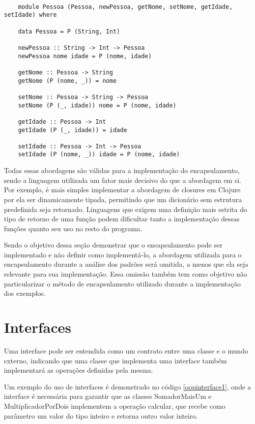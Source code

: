 \begin{lstlisting}[caption={Módulos como forma de encapsulamento},label=modulesencap]
    
    module Pessoa (Pessoa, newPessoa, getNome, setNome, getIdade, setIdade) where

    data Pessoa = P (String, Int)

    newPessoa :: String -> Int -> Pessoa
    newPessoa nome idade = P (nome, idade)

    getNome :: Pessoa -> String
    getNome (P (nome, _)) = nome

    setNome :: Pessoa -> String -> Pessoa
    setNome (P (_, idade)) nome = P (nome, idade)

    getIdade :: Pessoa -> Int
    getIdade (P (_, idade)) = idade

    setIdade :: Pessoa -> Int -> Pessoa
    setIdade (P (nome, _)) idade = P (nome, idade)

\end{lstlisting}

Todas essas abordagens são válidas para a 
implementação do encapsulamento, sendo a 
linguagem utilizada um fator mais decisivo 
do que a abordagem em si. Por exemplo, é 
mais simples implementar a abordagem de closures 
em Clojure por ela ser dinamicamente tipada, 
permitindo que um dicionário sem estrutura 
predefinida seja retornado. Linguagens que exigem 
uma definição mais estrita do tipo de retorno 
de uma função podem dificultar tanto a 
implementação dessas funções quanto seu uso 
no resto do programa.

Sendo o objetivo dessa seção demonstrar que 
o encapsulamento pode ser implementado e 
não definir como implementá-lo, 
a abordagem utilizada para o encapsulamento 
durante a análise dos padrões será 
omitida, a menos que ela seja relevante para 
sua implementação. Essa omissão 
também tem como objetivo não particularizar o 
método de encapsulamento utilizado durante a 
implementação dos exemplos.

\section{Interfaces}

Uma interface pode ser entendida como um contrato 
entre uma classe e o mundo externo, indicando que 
uma classe que implementa uma interface também 
implementará as operações definidas 
pela mesma\cite{oracleooconcepts}. 

Um exemplo do uso de interfaces é demonstrado no código 
\ref{oopinterface1}, 
onde a interface é necessária para garantir que as 
classes SomadorMaisUm e MultiplicadorPorDois implementem 
a operação calcular, que recebe como parâmetro 
um valor do tipo inteiro e retorna outro valor 
inteiro.


